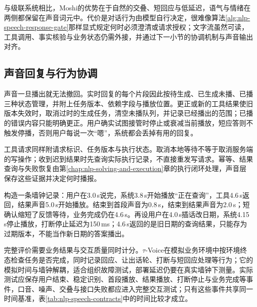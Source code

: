 与级联系统相比，Moshi的优势在于自然的交叠、短回应与低延迟，语气与情绪在两侧都保留在声音词元中。代价是对话行为由模型自行决定，很难像算法\ref{alg:nlp-speech-response-gate}那样显式规定何时必须澄清或请求授权；文字流虽然可读，工具调用、事实核验与业务状态仍需外接，并通过下一小节的协调机制与声音输出对齐。

\subsection{声音回复与行为协调}
\label{sec:nlp-speech-coordination}

声音一旦播出就无法撤回。实时回复的每个片段因此按待生成、已生成未播、已播三种状态管理，并附上任务版本、依赖字段与播放位置。更正或新的工具结果使旧版本失效时，取消过时的生成任务，清空未播队列，并记录已经播出的范围；已播的错误内容只能明确更正。用户确实试图接管时停止或衰减当前播放，短应答则不触发停播，否则用户每说一次“嗯”，系统都会丢掉有用的回复。

工具请求同样附请求标识、任务版本与执行状态。取消本地等待不等于取消服务端的写操作；收到迟到结果时先查询实际执行记录，不直接重发写请求。幂等、结果查询与失败恢复由第\ref{chap:nlp-solving-and-execution}章的执行闭环处理，声音层保存这些证据并决定何时播报。

构造一条墙钟记录：用户在3.0\,s说完，系统3.8\,s开始播放“正在查询”，工具4.6\,s返回，结果声音5.0\,s开始播放。结束到首段声音为0.8\,s，结束到结果声音为2.0\,s；短确认缩短了反馈等待，业务完成仍在4.6\,s。再设用户在4.0\,s插话改日期，系统4.15\,s停止播放，打断停止延迟为150\,ms；4.6\,s返回的是旧日期的查询结果，只能存为过期版本，不能当作新日期的答案播出。

完整评价需要业务结果与交互质量同时计分。$\tau$-Voice在模拟业务环境中按环境终态检查任务是否完成，同时记录回应、让出话轮、打断与短回应处理等行为；它的模拟时间与墙钟解耦，适合组织故障测试，部署延迟仍要在真实墙钟下测量。实际测试应保存用户结束、稳定识别、首段播放、结果播放、打断停止与业务完成等事件，口音、噪声、交叠与接口失败都应进入完整交互测试；只有这些事件共享同一时间基准，表\ref{tab:nlp-speech-contracts}中的时间比较才成立。
